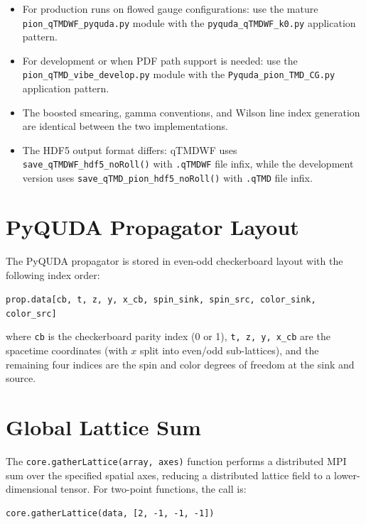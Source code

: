 \documentclass[11pt]{article}
\begin{document}
\begin{itemize}
    \item For production runs on flowed gauge configurations: use the mature \texttt{pion\_qTMDWF\_pyquda.py} module with the \texttt{pyquda\_qTMDWF\_k0.py} application pattern.
    \item For development or when PDF path support is needed: use the \texttt{pion\_qTMD\_vibe\_develop.py} module with the \texttt{Pyquda\_pion\_TMD\_CG.py} application pattern.
    \item The boosted smearing, gamma conventions, and Wilson line index generation are identical between the two implementations.
    \item The HDF5 output format differs: qTMDWF uses \texttt{save\_qTMDWF\_hdf5\_noRoll()} with \texttt{.qTMDWF} file infix, while the development version uses \texttt{save\_qTMD\_pion\_hdf5\_noRoll()} with \texttt{.qTMD} file infix.
\end{itemize}


\appendix
\section{PyQUDA Propagator Layout}

The PyQUDA propagator is stored in even-odd checkerboard layout with the following index order:

\begin{center}
\texttt{prop.data[cb, t, z, y, x\_cb, spin\_sink, spin\_src, color\_sink, color\_src]}
\end{center}

where \texttt{cb} is the checkerboard parity index (0 or 1), \texttt{t, z, y, x\_cb} are the spacetime coordinates (with $x$ split into even/odd sub-lattices), and the remaining four indices are the spin and color degrees of freedom at the sink and source.

\section{Global Lattice Sum}

The \texttt{core.gatherLattice(array, axes)} function performs a distributed MPI sum over the specified spatial axes, reducing a distributed lattice field to a lower-dimensional tensor. For two-point functions, the call is:

\begin{lstlisting}
core.gatherLattice(data, [2, -1, -1, -1])
\end{lstlisting}
\end{document}
